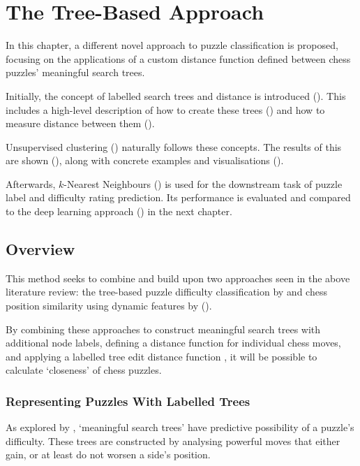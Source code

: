\chapter{The Tree-Based Approach}\label{treeChapter}

In this chapter, a different novel approach to puzzle classification is
proposed, focusing on the applications of a custom distance function defined
between chess puzzles' meaningful search trees.

Initially, the concept of labelled search trees and distance is introduced
(). This includes a high-level description of how to create these
trees () and how to measure distance between them
().

Unsupervised clustering () naturally follows these concepts. The
results of this are shown (), along with concrete examples and
visualisations ().

Afterwards, $k$-Nearest Neighbours () is used for the downstream
task of puzzle label and difficulty rating prediction. Its performance is
evaluated and compared to the deep learning approach () in the
next chapter.

\section{Overview}\label{treeS1}

This method seeks to combine and build upon two approaches seen in the above
literature review: the tree-based puzzle difficulty classification by
\citet{chessTrees} and chess position similarity using dynamic features by
\citet{chessMotifs} ().

By combining these approaches to construct meaningful search trees with
additional node labels, defining a distance function for individual chess
moves, and applying a labelled tree edit distance function
\citep{editDistTrees}, it will be possible to calculate `closeness' of chess
puzzles. 

\subsection{Representing Puzzles With Labelled Trees}\label{treeS11}

As explored by \citet{chessTrees}, `meaningful search trees' have predictive
possibility of a puzzle's difficulty. These trees are constructed by analysing
powerful moves that either gain, or at least do not worsen a side's position. 

